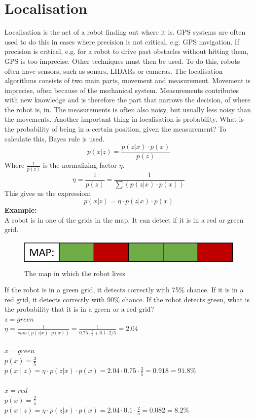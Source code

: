 \section{Localisation}
Localisation is the act of a robot finding out where it is. GPS systems are often used to do this in cases where precision is not critical, e.g. GPS navigation. If precision is critical, e.g. for a robot to drive past obstacles without hitting them, GPS is too imprecise. Other techniques must then be used. To do this, robots often have sensors, such as sonars, LIDARs or cameras. 
The localisation algorithms consists of two main parts, movement and measurement. Movement is imprecise, often because of the mechanical system. Measurements contributes with new knowledge and is therefore the part that narrows the decision, of where the robot is, in. The measurements is often also noisy, but usually less noisy than the movements.
Another important thing in localisation is probability. What is the probability of being in a certain position, given the measurement? To calculate this, Bayes rule is used.
\begin{equation}
p(x|z) = \frac{p(z|x)\cdot p(x)}{p(z)}
\end{equation}
Where $\frac{1}{p(z)}$ is the normalizing factor $\eta$.
\begin{equation}
\eta = \frac{1}{p(z)} = \frac{1}{\sum(p(z|x)\cdot p(x))}
\end{equation}
This gives us the expression:
\begin{equation}
p(x|z) = \eta \cdot p(z|x)\cdot p(x)
\end{equation}
\textbf{Example:}\\
A robot is in one of the grids in the map. It can detect if it is in a red or green grid. 
\begin{figure}[H]
\centering
\includegraphics[scale=1]{billeder/Localisation01.png}
\caption{The map in which the robot lives}
\label{fig:Localisation01}
\end{figure}
If the robot is in a green grid, it detects correctly with 75\% chance. If it is in a red grid, it detects correctly with 90\% chance.
If the robot detects green, what is the probability that it is in a green or a red grid?\\
$z = green$\\
$\eta = \frac{1}{sum(p(z|x)\cdot p(x))} = \frac{1}{0.75 \cdot \frac{3}{5} + 0.1 \cdot 2/5} = 2.04$\\\\
$x = green$\\
$p(x) = \frac{3}{5}$\\
$p(x \mid z) = \eta \cdot p(z|x)\cdot p(x) = 2.04 \cdot 0.75 \cdot \frac{3}{5} = 0.918 = 91.8\%$\\\\
$x = red$\\
$p(x) = \frac{2}{5}$\\
$p(x \mid z) = \eta \cdot p(z|x)\cdot p(x) = 2.04 \cdot 0.1 \cdot \frac{2}{5} = 0.082 = 8.2\%$
